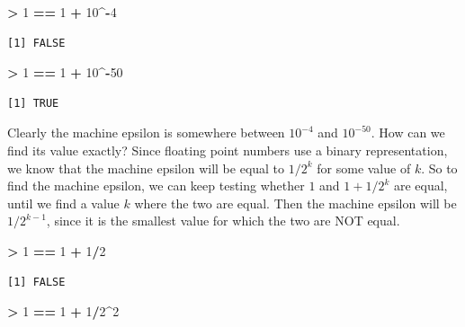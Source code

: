\documentclass[]{krantz}
\makeatletter
\newenvironment{Shaded}{\begin{snugshade}}{\end{snugshade}}
\newcommand{\DecValTok}[1]{\textcolor[rgb]{0.06,0.06,0.06}{#1}}
\newcommand{\OperatorTok}[1]{\textcolor[rgb]{0.43,0.43,0.43}{\textbf{#1}}}
\newcommand{\StringTok}[1]{\textcolor[rgb]{0.5,0.5,0.5}{#1}}
\newenvironment{kframe}{%
\medskip{}
\setlength{\fboxsep}{.8em}
 \def\at@end@of@kframe{}%
 \ifinner\ifhmode%
  \def\at@end@of@kframe{\end{minipage}}%
  \begin{minipage}{\columnwidth}%
 \fi\fi%
 \def\FrameCommand##1{\hskip\@totalleftmargin \hskip-\fboxsep
 \colorbox{shadecolor}{##1}\hskip-\fboxsep
     \hskip-\linewidth \hskip-\@totalleftmargin \hskip\columnwidth}%
 \MakeFramed {\advance\hsize-\width
   \@totalleftmargin\z@ \linewidth\hsize
   \@setminipage}}%
 {\par\unskip\endMakeFramed%
 \at@end@of@kframe}
\renewenvironment{Shaded}{\begin{kframe}}{\end{kframe}}
\makeatother
\begin{document}
\begin{Shaded}
\begin{Highlighting}[]
\OperatorTok{>}\StringTok{ }\DecValTok{1} \OperatorTok{==}\StringTok{ }\DecValTok{1} \OperatorTok{+}\StringTok{ }\DecValTok{10}\OperatorTok{^-}\DecValTok{4}
\end{Highlighting}
\end{Shaded}

\begin{verbatim}
[1] FALSE
\end{verbatim}

\begin{Shaded}
\begin{Highlighting}[]
\OperatorTok{>}\StringTok{ }\DecValTok{1} \OperatorTok{==}\StringTok{ }\DecValTok{1} \OperatorTok{+}\StringTok{ }\DecValTok{10}\OperatorTok{^-}\DecValTok{50}
\end{Highlighting}
\end{Shaded}

\begin{verbatim}
[1] TRUE
\end{verbatim}

Clearly the machine epsilon is somewhere between \(10^{-4}\) and \(10^{-50}\). How can we find its value exactly? Since floating point numbers use a binary representation, we know that the machine epsilon will be equal to \(1/2^k\) for some value of \(k\). So to find the machine epsilon, we can keep testing whether \(1\) and \(1+1/2^k\) are equal, until we find a value \(k\) where the two are equal. Then the machine epsilon will be \(1/2^{k-1}\), since it is the smallest value for which the two are NOT equal.

\begin{Shaded}
\begin{Highlighting}[]
\OperatorTok{>}\StringTok{ }\DecValTok{1} \OperatorTok{==}\StringTok{ }\DecValTok{1} \OperatorTok{+}\StringTok{ }\DecValTok{1}\OperatorTok{/}\DecValTok{2}
\end{Highlighting}
\end{Shaded}

\begin{verbatim}
[1] FALSE
\end{verbatim}

\begin{Shaded}
\begin{Highlighting}[]
\OperatorTok{>}\StringTok{ }\DecValTok{1} \OperatorTok{==}\StringTok{ }\DecValTok{1} \OperatorTok{+}\StringTok{ }\DecValTok{1}\OperatorTok{/}\DecValTok{2}\OperatorTok{^}\DecValTok{2}
\end{Highlighting}
\end{Shaded}
\end{document}
